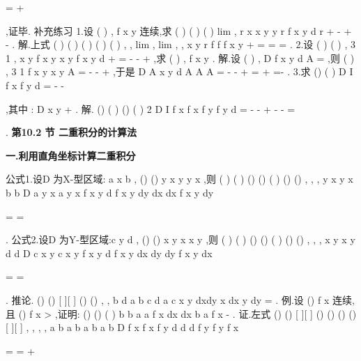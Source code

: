 =
+
\ge 




\int \int 
\int \int 
\int \int 
,证毕. 
\textcolor{lyred}{补充练习 }
1.设
(
)
,
f x y 连续,求
(
)
(
)
(
)
lim
,
r
x x
y y
r
f x y d
r
\sigma 
\pi 
+
\to 
-
+
-
\le 
\int \int 
. 
解.上式
(
)
(
)
(
)
(
)
(
)
,
,
lim
,
lim
,
,
x
y
r
f
f
f x
y
\psi \eta 
\psi \eta 
\psi \eta 
+
\to 
\to 
=
=
=
. 
2.设
(
)
(
)
,
3 1
,
x
y
f x y
x
y
f x y d\sigma 
+
\le 
=
-
-
+\int \int 
,求
(
)
,
f x y . 
解.设
(
)
,
D
f x y d
A
\sigma =
\int \int 
,则
(
)
,
3 1
f x y
x
y
A
=
-
-
+
,于是 
D
A
x
y d
A
A
A
\pi 
\sigma 
\pi 
\pi 
\pi 
\pi 
=
-
-
+
=
+
\Rightarrow 
=-
\int \int 
. 
3.求
()
(
)
D
I
f x
f
y
d\sigma 
=
-
-




\int \int 
,其中
:
D
x
y
+
\le . 
解.
()
(
)
()
(
)
2 D
I
f x
f
x
f
y
f
y
d\sigma 
=
-
-
+
-
-
=




\int \int 
. 
\vspace{6pt}
{\large \bfseries \textcolor{lyred}{第10.2 节 二重积分的计算法}}

\vspace{4pt}
{\bfseries \textcolor{lyred}{一.利用直角坐标计算二重积分}}

\textcolor{lyred}{公式1}.设D 为X-型区域: a
x
b
\le 
\le 
,
()
()
y
x
y
y
x
\le 
\le 
,则 
(
)
(
)
()
()
(
)
()
()
,
,
,
y
x
y
x
b
b
D
a
y
x
a
y
x
f x y d
f x y dy dx
dx
f x y dy
\sigma 


=
=






\int \int 
\int \int 
\int 
\int 
. 
\textcolor{lyred}{公式2}.设D 为Y-型区域:c
y
d
\le 
\le 
,
()
()
x
y
x
x
y
\le 
\le 
,则 
(
)
(
)
()
()
(
)
()
()
,
,
,
x
y
x
y
d
d
D
c
x
y
c
x
y
f x y d
f x y dx dy
dy
f x y dx
\sigma 


=
=






\int \int 
\int \int 
\int 
\int 
. 
\textcolor{lyred}{推论}.
()
()
[
][
]
()
()
,
,
b
d
a b
c d
a
c
x
y dxdy
x dx
y dy
\varphi 
\zeta 
\varphi 
\zeta 
\times 
\cdots 
=
\cdots 
\int \int 
\int 
\int 
. 
\textcolor{lyred}{例}.设
()
f x 连续,且
()
f x >
,证明:
()
()
(
)
b
b
a
a
f x dx
dx
b
a
f x
\ge 
-
\int 
\int 
. 
证.左式
()
()
[
][
]
()
()
()
()
[
][
]
,
,
,
,
a b
a b
a b
a b
D
f x
f x
f
y
d
d
d
f
y
f
y
f x
\sigma 
\sigma 
\sigma 
\times 
\times 


=
=
+
\ge 




